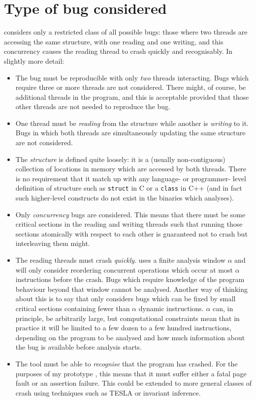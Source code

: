 \section{Type of bug considered}

{\Technique} considers only a restricted class of all possible bugs:
those where two threads are accessing the same structure, with one
reading and one writing, and this concurrency causes the reading
thread to crash quickly and recognisably.  In slightly more detail:

\begin{itemize}
\item The bug must be reproducible with only \emph{two} threads
  interacting.  Bugs which require three or more threads are not
  considered.  There might, of course, be additional threads in the
  program, and this is acceptable provided that those other threads
  are not needed to reproduce the bug.
\item One thread must be \emph{reading} from the structure while
  another is \emph{writing} to it.  Bugs in which both threads are
  simultaneously updating the same structure are not considered.
\item The \emph{structure} is defined quite loosely: it is a (usually
  non-contiguous) collection of locations in memory which are accessed
  by both threads.  There is no requirement that it match up with any
  language- or programmer- level definition of structure such as
  \verb|struct| in C or a \verb|class| in C++ (and in fact such
  higher-level constructs do not exist in the binaries which
  {\technique} analyses).
\item Only \emph{concurrency} bugs are considered.  This means that
  there must be some critical sections in the reading and writing
  threads such that running those sections atomically with respect to
  each other is guaranteed not to crash but interleaving them might.
\item The reading threads must crash \emph{quickly}.  {\Technique}
  uses a finite analysis window $\alpha$ and will only consider
  reordering concurrent operations which occur at most $\alpha$
  instructions before the crash.  Bugs which require knowledge of the
  program behaviour beyond that window cannot be analysed.  Another
  way of thinking about this is to say that {\technique} only
  considers bugs which can be fixed by small critical sections
  containing fewer than $\alpha$ dynamic instructions.  $\alpha$ can,
  in principle, be arbitrarily large, but computational constraints
  mean that in practice it will be limited to a few dozen to a few
  hundred instructions, depending on the program to be analysed and
  how much information about the bug is available before analysis
  starts.
\item The tool must be able to \emph{recognise}
  that the program has crashed.  For the purposes of my prototype
  {\implementation}, this means that it must suffer either a fatal
  page fault or an assertion failure.  This could be extended to more
  general classes of crash using techniques such as TESLA\needCite{}
  or invariant inference\needCite{}.


\end{itemize}

